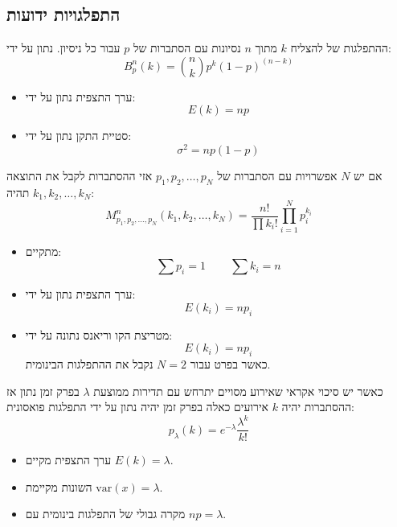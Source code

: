 \documentclass{tstextbook}
\begin{document}
\subsection{התפלגויות ידועות}

\begin{definition}
ההתפלגות של להצליח \(k\) מתוך \(n\) נסיונות עם הסתברות של \(p\) עבור כל ניסיון. נתון על ידי:
$$B_{p}^{n}(k)={\binom{n}{k}}p^{k}(1-p)^{(n-k)}$$

\end{definition}
\begin{proposition}
  \begin{itemize}
    \item ערך התצפית נתון על ידי:
$$E(k)=np$$
    \item סטיית התקן נתון על ידי:
$$\sigma^{2}=np(1-p)$$
  \end{itemize}
\end{proposition}
\begin{definition}
אם יש \(N\) אפשרויות עם הסתברות של \(p_{1},p_{2},\dots,p_{N}\) אזי ההסתברות לקבל את התוצאה \(k_{1},k_{2},\dots,k_{N}\) תהיה:
$$M_{p_{1},p_{2},\ldots,p_{N}}^{n}(k_{1},k_{2},\ldots,k_{N})={\frac{n!}{\prod k_{i}!}}\prod_{i=1}^{N}p_{i}^{k_{i}}$$

\end{definition}
\begin{proposition}
  \begin{itemize}
    \item מתקיים:
$$\sum p_{i}=1\,\qquad \sum k_{i}=n$$
    \item ערך התצפית נתון על ידי:
$$E(k_{i})=n p_{i}$$
    \item מטריצת הקו וריאנס נתונה על ידי:
$$E(k_{i})=n p_{i}$$
כאשר בפרט עבור \(N=2\) נקבל את ההתפלגות הבינומית.
  \end{itemize}
\end{proposition}
\begin{definition}
כאשר יש סיכוי אקראי שאירוע מסויים יתרחש עם תדירות ממוצעת \(\lambda\) בפרק זמן נתון אז ההסתברות יהיה \(k\) אירועים כאלה בפרק זמן יהיה נתון על ידי התפלגות פואסונית:
$$p_{\lambda}(k)=e^{-\lambda}\frac{\lambda^{k}}{k!}$$

\end{definition}
\begin{proposition}
  \begin{itemize}
    \item ערך התצפית מקיים \(E(k)=\lambda\).
    \item השונות מקיימת \(\mathrm{var}(x)=\lambda\).
    \item מקרה גבולי של התפלגות בינומית עם \(np=\lambda\).
  \end{itemize}
\end{proposition}
\end{document}
